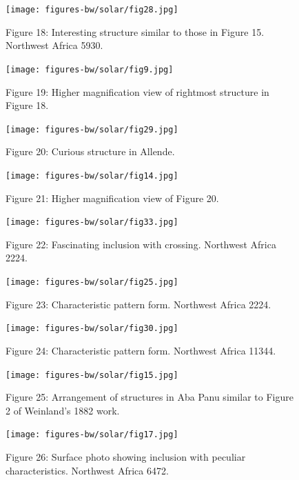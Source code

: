 \documentclass[a4paper, 12pt, oneside]{article}
\begin{document}
\begin{figure}[b]
\texttt{[image: figures-bw/solar/fig28.jpg]}
\caption{Figure 18: Interesting structure similar to those in Figure 15. Northwest Africa 5930.}
\centering
\end{figure}
\clearpage

\begin{figure}[b]
\centering
\texttt{[image: figures-bw/solar/fig9.jpg]}
\caption{Figure 19: Higher magnification view of rightmost structure in Figure 18.}
\end{figure}
\clearpage

\begin{figure}[b]
\centering
\texttt{[image: figures-bw/solar/fig29.jpg]}
\caption{Figure 20: Curious structure in Allende.}
\end{figure}
\clearpage

\begin{figure}[b]
\texttt{[image: figures-bw/solar/fig14.jpg]}
\caption{Figure 21: Higher magnification view of Figure 20.}
\centering
\end{figure}
\clearpage

\begin{figure}[b]
\texttt{[image: figures-bw/solar/fig33.jpg]}
\caption{Figure 22: Fascinating inclusion with crossing. Northwest Africa 2224.}
\centering
\end{figure}
\clearpage

\begin{figure}[b]
\centering
\texttt{[image: figures-bw/solar/fig25.jpg]}
\caption{Figure 23: Characteristic pattern form. Northwest Africa 2224.}
\end{figure}
\clearpage

\begin{figure}[b]
\texttt{[image: figures-bw/solar/fig30.jpg]}
\caption{Figure 24: Characteristic pattern form. Northwest Africa 11344.}
\centering
\end{figure}
\clearpage

\begin{figure}[b]
\centering
\texttt{[image: figures-bw/solar/fig15.jpg]}
\caption{Figure 25: Arrangement of structures in Aba Panu similar to Figure 2 of Weinland's 1882 work.}
\end{figure}
\clearpage

\begin{figure}[b]
\texttt{[image: figures-bw/solar/fig17.jpg]}
\caption{Figure 26: Surface photo showing inclusion with peculiar characteristics. Northwest Africa 6472.}
\centering
\end{figure}
\clearpage
\end{document}
